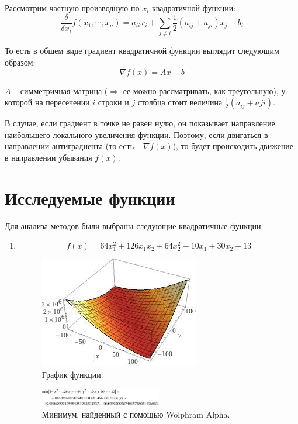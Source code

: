 \documentclass[12pt]{article}
\begin{document}
Рассмотрим частную производную по $x_i$ квадратичной функции:
\[ \frac{\delta}{\delta x_i}f(x_1, \cdots, x_n) = a_{ii}x_i + \sum_{j \neq i} \frac{1}{2} (a_{ij}+a_{ji})x_j - b_i \]

То есть в общем виде градиент квадратичной функции выглядит следующим образом:
\[ \nabla f(x) = Ax-b \]

$A$ -- симметричная матрица ($\Rightarrow$ ее можно рассматривать, как треугольную), у которой на пересечении $i$ строки и $j$ столбца стоит величина $\frac{1}{2}(a_{ij}+a{ji})$.

В случае, если градиент в точке не равен нулю, он показывает направление наибольшего локального увеличения функции. Поэтому, если двигаться в направлении антиградиента (то есть $-\nabla f(x)$), то будет происходить движение в направлении убывания $f(x)$.

\section{Исследуемые функции}

Для анализа методов были выбраны следующие квадратичные функции:
\begin{enumerate}

\item \[ f(x) = 64x_1^2 + 126x_1x_2 + 64x_2^2 - 10x_1 + 30x_2 + 13 \]
\begin{figure}[h]
	\centering
	\includegraphics[scale=0.5]{img/func1_plot.jpeg}
	\caption{График функции.}
\end{figure}

\begin{figure}[h]
	\centering
	\includegraphics[width=0.5\textwidth]{img/func1_min.jpeg}
	\caption{Минимум, найденный с помощью Wolphram Alpha.}
\end{figure}

\end{enumerate}
\end{document}
